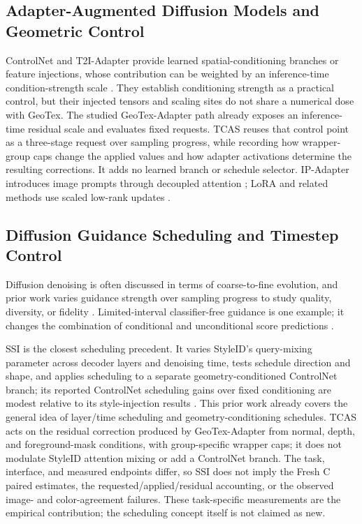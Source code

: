 \documentclass[times,twocolumn,final]{elsarticle}
\begin{document}
\subsection{Adapter-Augmented Diffusion Models and Geometric Control}
\label{subsec:adapter}

ControlNet and T2I-Adapter provide learned spatial-conditioning branches or feature injections, whose contribution can be weighted by an inference-time condition-strength scale \cite{mou2023t2iadapter,zhang2023controlnet}. They establish conditioning strength as a practical control, but their injected tensors and scaling sites do not share a numerical dose with GeoTex. The studied GeoTex-Adapter path already exposes an inference-time residual scale and evaluates fixed requests. TCAS reuses that control point as a three-stage request over sampling progress, while recording how wrapper-group caps change the applied values and how adapter activations determine the resulting corrections. It adds no learned branch or schedule selector. IP-Adapter introduces image prompts through decoupled attention \cite{ye2023ipadapter}; LoRA and related methods use scaled low-rank updates \cite{hu2022lora,liu2024dora,zhang2023adalora}.

\subsection{Diffusion Guidance Scheduling and Timestep Control}
\label{subsec:guidance}

Diffusion denoising is often discussed in terms of coarse-to-fine evolution, and prior work varies guidance strength over sampling progress to study quality, diversity, or fidelity \cite{ho2020ddpm,song2021ddim,ho2022cfg,castillo2023adaptive}. Limited-interval classifier-free guidance is one example; it changes the combination of conditional and unconditional score predictions \cite{kynkanniemi2024limited}.

SSI is the closest scheduling precedent. It varies StyleID's query-mixing parameter across decoder layers and denoising time, tests schedule direction and shape, and applies scheduling to a separate geometry-conditioned ControlNet branch; its reported ControlNet scheduling gains over fixed conditioning are modest relative to its style-injection results \cite{kulkarni2026ssi}. This prior work already covers the general idea of layer/time scheduling and geometry-conditioning schedules. TCAS acts on the residual correction produced by GeoTex-Adapter from normal, depth, and foreground-mask conditions, with group-specific wrapper caps; it does not modulate StyleID attention mixing or add a ControlNet branch. The task, interface, and measured endpoints differ, so SSI does not imply the Fresh C paired estimates, the requested/applied/residual accounting, or the observed image- and color-agreement failures. These task-specific measurements are the empirical contribution; the scheduling concept itself is not claimed as new.
\end{document}

